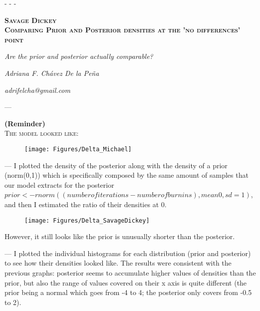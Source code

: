 \documentclass[a4paper ]{article}
\begin{document}
- - -

\vspace{50mm}
\begin{center}
{\Huge \textsc{\textbf{Savage Dickey}}}\\
{\Huge \textsc{\textbf{Comparing Prior and Posterior densities at the 'no differences' point}}}\\
\vspace{20mm}
\end{center}

\begin{center}
\textit{\huge Are the prior and posterior actually comparable?}\\
\bigskip
\end{center}

\begin{center}
\textit{\huge Adriana F. Chávez De la Peña}\\
\end{center}

\begin{center}
\vfill
\textit{\huge adrifelcha@gmail.com}\\
\end{center}

\newpage



---
\begin{center}
{\LARGE \textbf{(Reminder)} }\\
{\small \textsc{The model looked like:}}\\
\end{center}
\begin{figure}[h]
\centering
\texttt{[image: Figures/Delta\_Michael]}
\end{figure}
\clearpage


---
I plotted the density of the posterior along with the density of a prior (norm(0,1)) which is specifically composed by the same amount of samples that our model extracts for the posterior $prior <- rnorm((number of iterations-number of burnins), mean 0, sd =1)$, and then I estimated the ratio of their densities at $0$.
\begin{figure}[h]
\centering
\texttt{[image: Figures/Delta\_SavageDickey]}
\end{figure}

However, it still looks like the prior is unusually shorter than the posterior.
\clearpage


---
I plotted the individual histograms for each distribution (prior and posterior) to see how their densities looked like. The results were consistent with the previous graphs: posterior seems to accumulate higher values of densities than the prior, but also the range of values covered on their x axis is quite different (the prior being a normal which goes from -4 to 4; the posterior only covers from -0.5 to 2).
\end{document}
